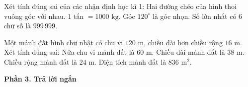\begin{ex} %
Xét tính đúng sai của các nhận định học kì 1:
\choiceTF
{\True Hai đường chéo của hình thoi vuông góc với nhau.}
{\True $1$ tấn $= 1000\text{ kg}$.}
{Góc $120^\circ$ là góc nhọn.}
{\True Số lớn nhất có 6 chữ số là $999\,999$.}
\end{ex}

\begin{ex} %
Một mảnh đất hình chữ nhật có chu vi $120\text{ m}$, chiều dài hơn chiều rộng $16\text{ m}$. Xét tính đúng sai:
\choiceTF
{\True Nửa chu vi mảnh đất là $60\text{ m}$.}
{\True Chiều dài mảnh đất là $38\text{ m}$.}
{Chiều rộng mảnh đất là $24\text{ m}$.}
{\True Diện tích mảnh đất là $836\text{ m}^2$.}
\end{ex}

\textbf{Phần 3. Trả lời ngắn}

